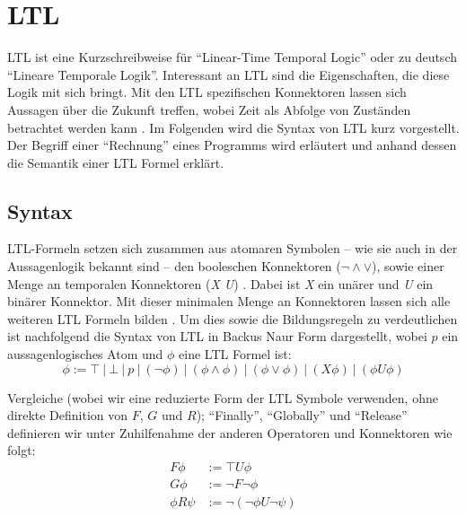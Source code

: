 \section{LTL}

LTL ist eine Kurzschreibweise für "`Linear-Time Temporal Logic"' oder zu deutsch "`Lineare Temporale Logik"'. Interessant an LTL sind die Eigenschaften, die diese Logik mit sich bringt. Mit den LTL spezifischen Konnektoren lassen sich Aussagen über die Zukunft treffen, wobei Zeit als Abfolge von Zuständen betrachtet werden kann \cite{huth+04}. Im Folgenden wird die Syntax von LTL kurz vorgestellt. Der Begriff einer "`Rechnung"' eines Programms wird erläutert und anhand dessen die Semantik einer LTL Formel erklärt.

\subsection{Syntax}

LTL-Formeln setzen sich zusammen aus atomaren Symbolen -- wie sie auch in der Aussagenlogik bekannt sind -- den booleschen Konnektoren ($\lnot \land \lor$), sowie einer Menge an temporalen Konnektoren (\textit{X U}) \cite{huth+04,vardi+96}. Dabei ist \textit{X} ein unärer und \textit{U} ein binärer Konnektor. Mit dieser minimalen Menge an Konnektoren lassen sich alle weiteren LTL Formeln bilden \cite{vardi+96}.
Um dies sowie die Bildungsregeln zu verdeutlichen ist nachfolgend die Syntax von LTL in Backus Naur Form dargestellt, wobei $p$ ein aussagenlogisches Atom und $\phi$ eine LTL Formel ist:
\begin{equation}
\label{ltl:syntax_basics}
    \phi := \top\ |\ \bot\ |\ p\ |\ (\lnot\phi)\ |\ (\phi \land \phi)\ |\ (\phi \lor \phi)\ |\ (X\phi)\ |\ (\phi U\phi)
\end{equation}

Vergleiche \cite{huth+04} (wobei wir eine reduzierte Form der LTL Symbole verwenden, ohne direkte Definition von $F$, $G$ und $R$); "`Finally"', "`Globally"' und "`Release"' definieren wir unter Zuhilfenahme der anderen Operatoren und Konnektoren wie folgt:
\begin{equation}
\label{ltl:syntax_details}
\begin{split}
    F\phi &:= \top U\phi\\
    G\phi &:= \lnot F\lnot\phi\\
    \phi R\psi &:= \lnot(\lnot\phi U\lnot\psi)\\
\end{split}
\end{equation}

